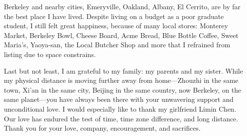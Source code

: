 \documentclass[thesis.tex]{subfiles}
\begin{document}
\begin{acknowledgements}
  Berkeley and nearby cities, Emeryville, Oakland, Albany, El Cerrito, are by
  far the best place I have lived. Despite living on a budget as a poor graduate
  student, I still felt great happiness, because of many local stores: Monterey
  Market, Berkeley Bowl, Cheese Board, Acme Bread, Blue Bottle Coffee, Sweet
  Maria's, Yaoya-san, the Local Butcher Shop and more that I refrained from
  listing due to space constrains.

  Last but not least, I am grateful to my family: my parents and my
  sister. While my physical distance is moving further away from home---Zhouzhi
  in the same town, Xi'an in the same city, Beijing in the same country, now
  Berkeley, on the same planet---you have always been there with your unwavering
  support and unconditional love. I would especially like to thank my girlfriend
  Limin Chen. Our love has endured the test of time, time zone difference, and
  long distance. Thank you for your love, company, encouragement, and
  sacrifices.

\end{acknowledgements}
\end{document}
